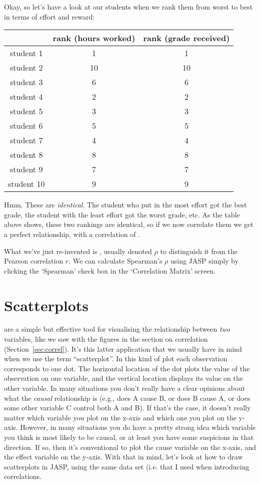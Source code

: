 Okay, so let's have a look at our students when we rank them from worst to best in terms of effort and reward: 
\begin{center}
\begin{tabular}{c|cc}
& rank (hours worked) & rank (grade received) \\ \hline
student    1 &   1 &   1 \\
student  2  & 10   &10 \\
student   3 &   6  &  6 \\
student    4 &   2 &   2 \\
student    5 &   3 &   3 \\
student   6  &  5  &  5 \\
student   7  &  4  &  4 \\
student   8  &  8  &  8 \\
student  9   & 7  &  7 \\
student   10  &  9&    9
\end{tabular}
\end{center}
Hmm. These are {\it identical}. The student who put in the most effort got the best grade, the student with the least effort got the worst grade, etc. As the table above shows, these two rankings are identical, so if we now correlate them we get a perfect relationship, with a correlation of .

What we've just re-invented is , usually denoted $\rho$ to distinguish it from the Pearson correlation $r$. We can calculate Spearman's $\rho$ using JASP simply by clicking the `Spearman' check box in the `Correlation Matrix' screen. 


\section{Scatterplots\label{sec:scatterplots}}

 are a simple but effective tool for visualising the relationship between {\it two} variables, like we saw with the figures in the section on correlation (Section~\ref{sec:correl}). It's this latter application that we usually have in mind when we use the term ``scatterplot''. In this kind of plot each observation corresponds to one dot. The horizontal location of the dot plots the value of the observation on one variable, and the vertical location displays its value on the other variable. In many situations you don't really have a clear opinions about what the {\it causal} relationship is (e.g., does A cause B, or does B cause A, or does some other variable C control both A and B). If that's the case, it doesn't really matter which variable you plot on the x-axis and which one you plot on the y-axis. However, in many situations you do have a pretty strong idea which variable you think is most likely to be causal, or at least you have some suspicions in that direction. If so, then it's conventional to plot the cause variable on the x-axis, and the effect variable on the y-axis. With that in mind, let's look at how to draw scatterplots in JASP, using the same  data set (i.e.  that I used when introducing correlations.

